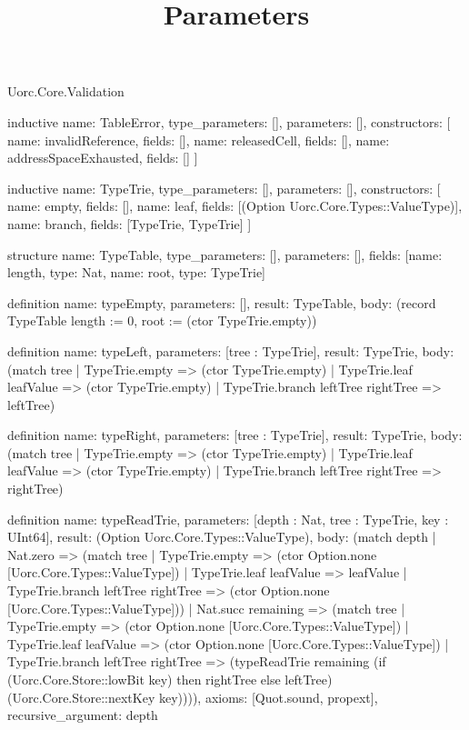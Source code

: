 \begin{lexlean}{Uorc.Core.Validation}
\title{Parameters}
\begin{semanticmodule}
inductive{
  name: TableError,
  type_parameters: [],
  parameters: [],
  constructors: [
    {name: invalidReference, fields: []},
    {name: releasedCell, fields: []},
    {name: addressSpaceExhausted, fields: []}
  ]
}

inductive{
  name: TypeTrie,
  type_parameters: [],
  parameters: [],
  constructors: [
    {name: empty, fields: []},
    {name: leaf, fields: [(Option Uorc.Core.Types::ValueType)]},
    {name: branch, fields: [TypeTrie, TypeTrie]}
  ]
}

structure{
  name: TypeTable,
  type_parameters: [],
  parameters: [],
  fields: [{name: length, type: Nat}, {name: root, type: TypeTrie}]
}

definition{
  name: typeEmpty,
  parameters: [],
  result: TypeTable,
  body: (record TypeTable {length := 0, root := (ctor TypeTrie.empty)})
}

definition{
  name: typeLeft,
  parameters: [tree : TypeTrie],
  result: TypeTrie,
  body: (match tree
    | TypeTrie.empty => (ctor TypeTrie.empty)
    | TypeTrie.leaf leafValue => (ctor TypeTrie.empty)
    | TypeTrie.branch leftTree rightTree => leftTree)
}

definition{
  name: typeRight,
  parameters: [tree : TypeTrie],
  result: TypeTrie,
  body: (match tree
    | TypeTrie.empty => (ctor TypeTrie.empty)
    | TypeTrie.leaf leafValue => (ctor TypeTrie.empty)
    | TypeTrie.branch leftTree rightTree => rightTree)
}

definition{
  name: typeReadTrie,
  parameters: [depth : Nat, tree : TypeTrie, key : UInt64],
  result: (Option Uorc.Core.Types::ValueType),
  body: (match depth
    | Nat.zero => (match tree
      | TypeTrie.empty => (ctor Option.none [Uorc.Core.Types::ValueType])
      | TypeTrie.leaf leafValue => leafValue
      | TypeTrie.branch leftTree rightTree => (ctor Option.none [Uorc.Core.Types::ValueType]))
    | Nat.succ remaining => (match tree
      | TypeTrie.empty => (ctor Option.none [Uorc.Core.Types::ValueType])
      | TypeTrie.leaf leafValue => (ctor Option.none [Uorc.Core.Types::ValueType])
      | TypeTrie.branch leftTree rightTree => (typeReadTrie remaining (if (Uorc.Core.Store::lowBit key) then rightTree else leftTree) (Uorc.Core.Store::nextKey key)))),
  axioms: [Quot.sound, propext],
  recursive_argument: depth
}


\end{semanticmodule}
\end{lexlean}
